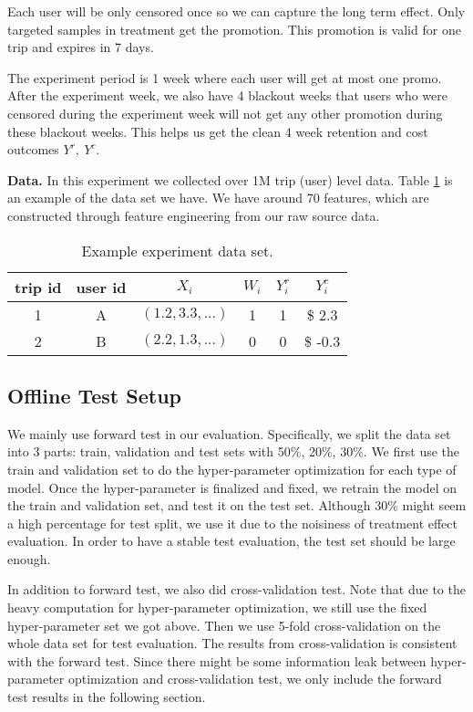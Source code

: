 Each user will be only censored once so we can capture the long term effect. Only targeted samples in treatment get the promotion. This promotion is valid for one trip and expires in 7 days.

The experiment period is 1 week where each user will get at most one promo. After the experiment week, we also have 4 blackout weeks that users who were censored during the experiment week will not get any other promotion during these blackout weeks. This helps us get the clean 4 week retention and cost outcomes $Y^r, \ Y^c$.

\textbf{Data.} In this experiment we collected over 1M trip (user) level data. Table \ref{tab:1} is an example of the data set we have. We have around 70 features, which are constructed through feature engineering from our raw source data.
\begin{table}
  \caption{Example experiment data set.}
  \label{tab:1}
  \begin{tabular}{cccccc}
    \toprule
    trip id & user id & $X_i$ & $W_i$ & $Y^r_i$ & $Y^c_i$\\
    \midrule
    1 & A & $(1.2, 3.3, ...)$ & 1 & 1 & \$ 2.3\\
    2 & B & $(2.2, 1.3, ...)$ & 0 & 0 & \$ -0.3\\
  \bottomrule
\end{tabular}
\end{table}

\subsection{Offline Test Setup} \label{offline test setup}
We mainly use forward test in our evaluation. Specifically, we split the data set into 3 parts: train, validation and test sets with 50\%, 20\%, 30\%. We first use the train and validation set to do the hyper-parameter optimization for each type of model. Once the hyper-parameter is finalized and fixed, we retrain the model on the train and validation set, and test it on the test set. Although 30\% might seem a high percentage for test split, we use it due to the noisiness of treatment effect evaluation. In order to have a stable test evaluation, the test set should be large enough.

In addition to forward test, we also did cross-validation test. Note that due to the heavy computation for hyper-parameter optimization, we still use the fixed hyper-parameter set we got above. Then we use 5-fold cross-validation on the whole data set for test evaluation. The results from cross-validation is consistent with the forward test. Since there might be some information leak between hyper-parameter optimization and cross-validation test, we only include the forward test results in the following section.


